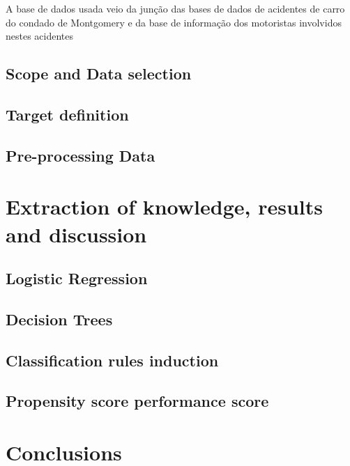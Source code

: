 \documentclass[conference]{IEEEtran}
\begin{document}
A base de dados usada veio da junção das bases de dados de acidentes de carro do condado de Montgomery 
\cite{incidents} e da base de informação dos motoristas involvidos nestes acidentes \cite{drivers}

\subsection{Scope and Data selection}
\subsection{Target definition}
\subsection{Pre-processing Data}

\section{Extraction of knowledge, results and discussion}

\subsection{Logistic Regression}

\subsection{Decision Trees}

\subsection{Classification rules induction}
\subsection{Propensity score performance score}


\section{Conclusions}



\end{document}
